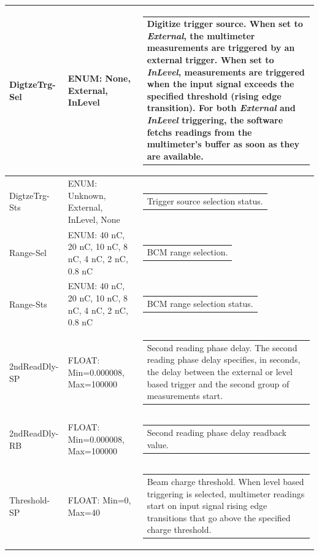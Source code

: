 \documentclass[openany]{article}
\begin{document}
\begin{longtable}{| m{3.0cm} m{4.5cm} m{7.0cm} |}
		DigtzeTrg-Sel & ENUM: None, External, InLevel & \begin{tabular}{@{}m{6cm}@{}}
				      	  Digitize trigger source. When set to \emph{External}, the multimeter measurements are triggered by an external trigger. When set to \emph{InLevel}, measurements are triggered when the input signal exceeds the specified threshold (rising edge transition). For both \emph{External} and \emph{InLevel} triggering, the software fetchs $ 2 \times count $ readings from the multimeter's buffer as soon as they are available.
					  \end{tabular} \\ \hline
		DigtzeTrg-Sts & ENUM: Unknown, External, InLevel, None & \begin{tabular}{@{}m{6cm}@{}}
	    					Trigger source selection status.
						\end{tabular} \\ \hline
		Range-Sel & ENUM: 40 nC, 20 nC, 10 nC, 8 nC, 4 nC, 2 nC, 0.8 nC & \begin{tabular}{@{}m{6cm}@{}}
	    					BCM range selection.
						\end{tabular} \\ \hline
		Range-Sts & ENUM: 40 nC, 20 nC, 10 nC, 8 nC, 4 nC, 2 nC, 0.8 nC & \begin{tabular}{@{}m{6cm}@{}}
	    					BCM range selection status.
						\end{tabular} \\ \hline
		2ndReadDly-SP & FLOAT: Min=0.000008, Max=100000 & \begin{tabular}{@{}m{6cm}@{}}
	    					Second reading phase delay. The second reading phase delay specifies, in seconds, the delay between the external or level based trigger and the second group of measurements start.
						\end{tabular} \\ \hline
		2ndReadDly-RB & FLOAT: Min=0.000008, Max=100000 & \begin{tabular}{@{}m{6cm}@{}}
	    					Second reading phase delay readback value.
						\end{tabular} \\ \hline
		Threshold-SP & FLOAT: Min=0, Max=40 & \begin{tabular}{@{}m{6cm}@{}}
	    					Beam charge threshold. When level based triggering is selected, multimeter readings start on input signal rising edge transitions that go above the specified charge threshold.

\end{tabular}
\end{longtable}
\end{document}
